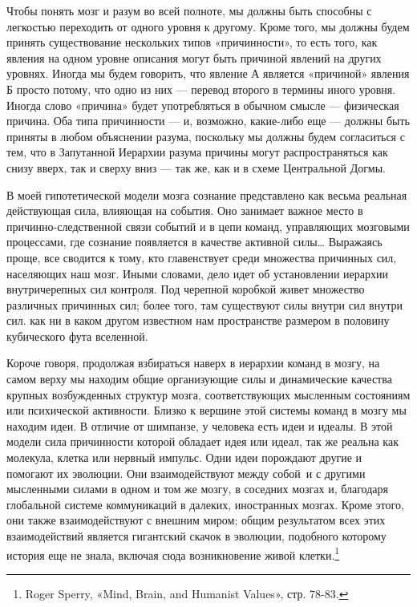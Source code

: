 \documentclass[../main.tex]{subfiles}
\begin{document}
Чтобы понять мозг и разум во всей полноте, мы должны быть способны с легкостью переходить от одного уровня к другому. Кроме того, мы должны будем принять существование нескольких типов «причинности», то есть того, как явления на одном уровне описания могут быть причиной явлений на других уровнях. Иногда мы будем говорить, что явление А является «причиной» явления Б просто потому, что одно из них --- перевод второго в термины иного уровня. Иногда слово «причина» будет употребляться в обычном смысле --- физическая причина. Оба типа причинности --- и, возможно, какие-либо еще --- должны быть приняты в любом объяснении разума, поскольку мы должны будем согласиться с тем, что в Запутанной Иерархии разума причины могут распространяться как снизу вверх, так и сверху вниз --- так же, как и в схеме Центральной Догмы.

В моей гипотетической модели мозга сознание представлено как весьма реальная действующая сила, влияющая на события. Оно занимает важное место в причинно-следственной связи событий и в цепи команд, управляющих мозговыми процессами, где сознание появляется в качестве активной силы\ldots{} Выражаясь проще, все сводится к тому, кто главенствует среди множества причинных сил, населяющих наш мозг. Иными словами, дело идет об установлении иерархии внутричерепных сил контроля. Под черепной коробкой живет множество различных причинных сил; более того, там существуют силы внутри сил внутри сил. как ни в каком другом известном нам пространстве размером в половину кубического фута вселенной.

Короче говоря, продолжая взбираться наверх в иерархии команд в мозгу, на самом верху мы находим общие организующие силы и динамические качества крупных возбужденных структур мозга, соответствующих мысленным состояниям или психической активности. Близко к вершине этой системы команд в мозгу мы находим идеи. В отличие от шимпанзе, у человека есть идеи и идеалы. В этой модели сила причинности которой обладает идея или идеал, так же реальна как молекула, клетка или нервный импульс. Одни идеи порождают другие и помогают их эволюции. Они взаимодействуют между собой~и с другими мысленными силами в одном и том же мозгу, в соседних мозгах и, благодаря глобальной системе коммуникаций в далеких, иностранных мозгах. Кроме этого, они также взаимодействуют с внешним миром; общим результатом всех этих взаимодействий является гигантский скачок в эволюции, подобного которому история еще не знала, включая сюда возникновение живой клетки.\footnote{Roger Sperry, «Mind, Brain, and Humanist Values», стр. 78-83.}
\end{document}
